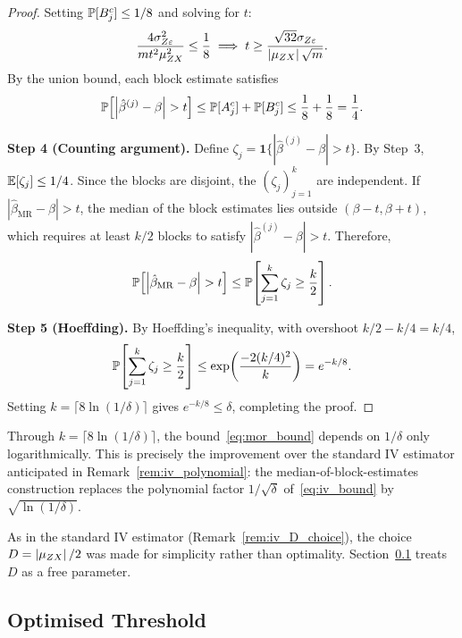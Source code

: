 \begin{proof}
    Setting $\operatorname{\mathbb{P}}[B_j^c]\leq 1/8$ and solving for $t$:
    \[
        \frac{4\sigma_{Z\varepsilon}^2}{mt^2\mu_{ZX}^2} \leq \frac{1}{8} \implies t \geq \frac{\sqrt{32}\sigma_{Z\varepsilon}}{\left|\mu_{ZX}\right|\sqrt{m}}.
    \]
    By the union bound, each block estimate satisfies
    \[
        \operatorname{\mathbb{P}}\!\left[\left|\hat{\beta}^{(j)}-\beta\right| > t\right] \leq \operatorname{\mathbb{P}}[A_j^c] + \operatorname{\mathbb{P}}[B_j^c] \leq \frac{1}{8} + \frac{1}{8} = \frac{1}{4}.
    \]

\medskip\noindent\textbf{Step 4 (Counting argument).} Define $\zeta_j = \mathbf{1}\{|\hat{\beta}^{(j)} - \beta| > t\}$. By Step~3, $\operatorname{\mathbb{E}}[\zeta_j] \leq 1/4$. Since the blocks are disjoint, the $(\zeta_j)_{j=1}^{k}$ are independent. If $|\hat{\beta}_{\mathrm{MR}} - \beta| > t$, the median of the block estimates lies outside $(\beta - t, \beta + t)$, which requires at least $k/2$ blocks to satisfy $|\hat{\beta}^{(j)} - \beta| > t$. Therefore,
\[
    \operatorname{\mathbb{P}}\!\left[\left|\hat{\beta}_{\mathrm{MR}} - \beta\right| > t\right] \leq \operatorname{\mathbb{P}}\!\left[\sum_{j=1}^{k}\zeta_j \geq \frac{k}{2}\right].
\]

\medskip\noindent\textbf{Step 5 (Hoeffding).} By Hoeffding's inequality, with overshoot $k/2 - k/4 = k/4$,
\[
    \operatorname{\mathbb{P}}\!\left[\sum_{j=1}^{k}\zeta_j \geq \frac{k}{2}\right] \leq \exp\!\left(\frac{-2(k/4)^2}{k}\right) = e^{-k/8}.
\]
Setting $k = \lceil 8\ln(1/\delta)\rceil$ gives $e^{-k/8} \leq \delta$, completing the proof.
\end{proof}

\begin{remark}
\label{rem:mor_logarithmic}
    Through $k = \lceil 8\ln(1/\delta)\rceil$, the bound~\eqref{eq:mor_bound} depends on $1/\delta$ only logarithmically. This is precisely the improvement over the standard IV estimator anticipated in Remark~\ref{rem:iv_polynomial}: the median-of-block-estimates construction replaces the polynomial factor $1/\sqrt{\delta}$ of~\eqref{eq:iv_bound} by $\sqrt{\ln(1/\delta)}$.
\end{remark}

\begin{remark}
\label{rem:mor_D_choice}
    As in the standard IV estimator (Remark~\ref{rem:iv_D_choice}), the choice $D = \left|\mu_{ZX}\right|/2$ was made for simplicity rather than optimality. Section~\ref{sec:mor_optimised} treats $D$ as a free parameter.
\end{remark}


\subsection{Optimised Threshold}
\label{sec:mor_optimised}

